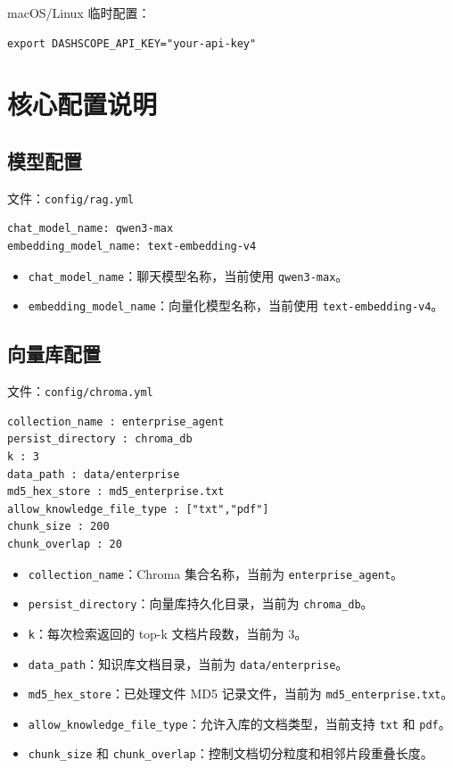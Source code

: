 \documentclass[UTF8,zihao=-4]{ctexart}
\begin{document}
macOS/Linux 临时配置：

\begin{Verbatim}[breaklines=true,breakanywhere=true,fontsize=\small]
export DASHSCOPE_API_KEY="your-api-key"
\end{Verbatim}

\section{核心配置说明}

\subsection{模型配置}

文件：\texttt{config/rag.yml}

\begin{Verbatim}[breaklines=true,breakanywhere=true,fontsize=\small]
chat_model_name: qwen3-max
embedding_model_name: text-embedding-v4
\end{Verbatim}

\begin{itemize}
\item \texttt{chat\_model\_name}：聊天模型名称，当前使用 \texttt{qwen3-max}。
\item \texttt{embedding\_model\_name}：向量化模型名称，当前使用 \texttt{text-embedding-v4}。
\end{itemize}

\subsection{向量库配置}

文件：\texttt{config/chroma.yml}

\begin{Verbatim}[breaklines=true,breakanywhere=true,fontsize=\small]
collection_name : enterprise_agent
persist_directory : chroma_db
k : 3
data_path : data/enterprise
md5_hex_store : md5_enterprise.txt
allow_knowledge_file_type : ["txt","pdf"]
chunk_size : 200
chunk_overlap : 20
\end{Verbatim}

\begin{itemize}
\item \texttt{collection\_name}：Chroma 集合名称，当前为 \texttt{enterprise\_agent}。
\item \texttt{persist\_directory}：向量库持久化目录，当前为 \texttt{chroma\_db}。
\item \texttt{k}：每次检索返回的 top-k 文档片段数，当前为 3。
\item \texttt{data\_path}：知识库文档目录，当前为 \texttt{data/enterprise}。
\item \texttt{md5\_hex\_store}：已处理文件 MD5 记录文件，当前为 \texttt{md5\_enterprise.txt}。
\item \texttt{allow\_knowledge\_file\_type}：允许入库的文档类型，当前支持 \texttt{txt} 和 \texttt{pdf}。
\item \texttt{chunk\_size} 和 \texttt{chunk\_overlap}：控制文档切分粒度和相邻片段重叠长度。
\end{itemize}
\end{document}
